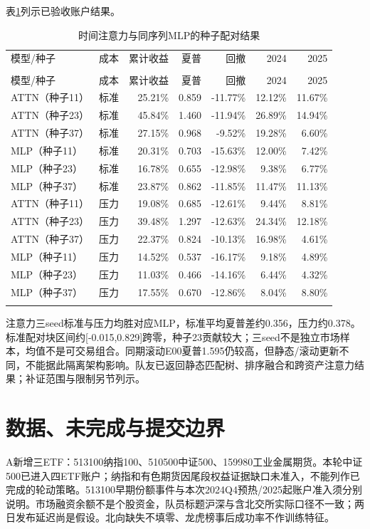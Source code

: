 \documentclass[12pt]{article}
\newcommand{\toprule}{\noalign{\hrule height .8pt}}
\newcommand{\midrule}{\noalign{\hrule height .4pt}}
\newcommand{\bottomrule}{\noalign{\hrule height .8pt}}
\begin{document}
表\ref{tab:v3supp2}列示已验收账户结果。
{\footnotesize
\begin{longtable}{@{}lrrrrrr@{}}
\caption{时间注意力与同序列MLP的种子配对结果}\label{tab:v3supp2}\\
\toprule
模型/种子 & 成本 & 累计收益 & 夏普 & 回撤 & 2024 & 2025 \\
\midrule\endfirsthead
\multicolumn{7}{c}{表\thetable（续）}\\\toprule
模型/种子 & 成本 & 累计收益 & 夏普 & 回撤 & 2024 & 2025 \\\midrule\endhead
ATTN（种子11） & 标准 & 25.21\% & 0.859 & -11.77\% & 12.12\% & 11.67\% \\
ATTN（种子23） & 标准 & 45.84\% & 1.460 & -11.94\% & 26.89\% & 14.94\% \\
ATTN（种子37） & 标准 & 27.15\% & 0.968 & -9.52\% & 19.28\% & 6.60\% \\
MLP（种子11） & 标准 & 20.31\% & 0.703 & -15.63\% & 12.00\% & 7.42\% \\
MLP（种子23） & 标准 & 16.78\% & 0.655 & -12.98\% & 9.38\% & 6.77\% \\
MLP（种子37） & 标准 & 23.87\% & 0.862 & -11.85\% & 11.47\% & 11.13\% \\
ATTN（种子11） & 压力 & 19.08\% & 0.685 & -12.61\% & 9.44\% & 8.81\% \\
ATTN（种子23） & 压力 & 39.48\% & 1.297 & -12.63\% & 24.34\% & 12.18\% \\
ATTN（种子37） & 压力 & 22.37\% & 0.824 & -10.13\% & 16.98\% & 4.61\% \\
MLP（种子11） & 压力 & 14.52\% & 0.537 & -16.17\% & 9.18\% & 4.89\% \\
MLP（种子23） & 压力 & 11.03\% & 0.466 & -14.16\% & 6.44\% & 4.32\% \\
MLP（种子37） & 压力 & 17.55\% & 0.670 & -12.86\% & 8.04\% & 8.80\% \\
\bottomrule\end{longtable}}
注意力三seed标准与压力均胜对应MLP，标准平均夏普差约0.356，压力约0.378。标准配对块区间约[-0.015,0.829]跨零，种子23贡献较大；三seed不是独立市场样本，均值不是可交易组合。同期滚动E00夏普1.595仍较高，但静态/滚动更新不同，不能据此隔离架构影响。队友已返回静态匹配树、排序融合和跨资产注意力结果；补证范围与限制另节列示。

\section{数据、未完成与提交边界}
A新增三ETF：513100纳指100、510500中证500、159980工业金属期货。本轮中证500已进入四ETF账户；纳指和有色期货因尾段权益证据缺口未准入，不能列作已完成的轮动策略。513100早期份额事件与本次2024Q4预热/2025起账户准入须分别说明。市场融资余额不是个股资金，队员标题沪深与含北交所实际口径不一致；两日发布延迟尚是假设。北向缺失不填零、龙虎榜事后成功率不作训练特征。
\end{document}
